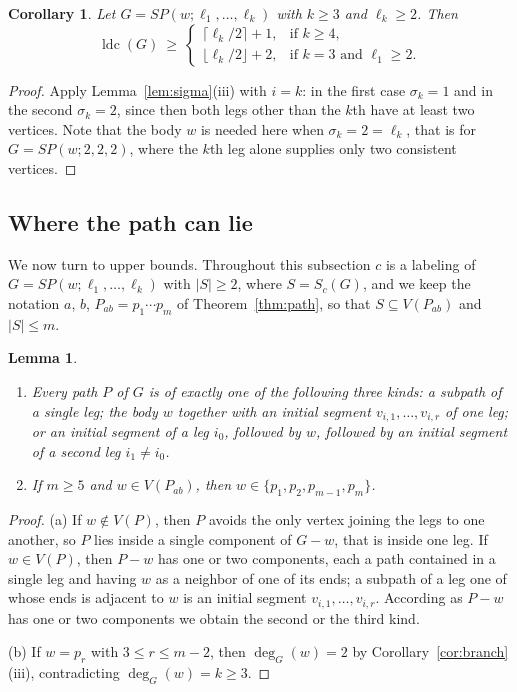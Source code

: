 \documentclass[reqno,10pt]{article}
\newtheorem{lemma}[theorem]{Lemma}
\newtheorem{corollary}[theorem]{Corollary}
\theoremstyle{definition}
\numberwithin{equation}{section}
\numberwithin{theorem}{section}
\newcommand{\ldc}{\operatorname{ldc}}
\begin{document}
\begin{corollary}
\label{cor:spiderlower}
Let $G=SP(w;\ell_1,\dots,\ell_k)$ with $k\ge3$ and $\ell_k\ge2$. Then
\[
  \ldc(G)\ \ge\
  \begin{cases}
    \lceil \ell_k/2\rceil+1, & \text{if } k\ge4,\\
    \lfloor \ell_k/2\rfloor+2, & \text{if } k=3 \text{ and } \ell_1\ge2 .
  \end{cases}
\]
\end{corollary}

\begin{proof}
Apply Lemma~\ref{lem:sigma}(iii) with $i=k$: in the first case $\sigma_k=1$ and
in the second $\sigma_k=2$, since then both legs other than the $k$th have at
least two vertices. Note that the body $w$ is needed here when
$\sigma_k=2=\ell_k$, that is for $G=SP(w;2,2,2)$, where the $k$th leg alone
supplies only two consistent vertices.
\end{proof}

\subsection{Where the path can lie}

We now turn to upper bounds. Throughout this subsection $c$ is a labeling of
$G=SP(w;\ell_1,\dots,\ell_k)$ with $|S|\ge2$, where $S=S_c(G)$, and we keep the
notation $a$, $b$, $P_{ab}=p_1\cdots p_m$ of Theorem~\ref{thm:path}, so that
$S\subseteq V(P_{ab})$ and $|S|\le m$.

\begin{lemma}
\label{lem:bodypos}
\begin{enumerate}
\item[\textup{(a)}] Every path $P$ of $G$ is of exactly one of the following
three kinds: a subpath of a single leg; the body $w$ together with an initial
segment $v_{i,1},\dots,v_{i,r}$ of one leg; or an initial segment of a leg
$i_0$, followed by $w$, followed by an initial segment of a second leg
$i_1\ne i_0$.
\item[\textup{(b)}] If $m\ge5$ and $w\in V(P_{ab})$, then
$w\in\{p_1,p_2,p_{m-1},p_m\}$.
\end{enumerate}
\end{lemma}

\begin{proof}
(a) If $w\notin V(P)$, then $P$ avoids the only vertex joining the legs to one
another, so $P$ lies inside a single component of $G-w$, that is inside one leg.
If $w\in V(P)$, then $P-w$ has one or two components, each a path contained in
a single leg and having $w$ as a neighbor of one of its ends; a subpath of a
leg one of whose ends is adjacent to $w$ is an initial segment
$v_{i,1},\dots,v_{i,r}$. According as $P-w$ has one or two components we
obtain the second or the third kind.

(b) If $w=p_r$ with $3\le r\le m-2$, then $\deg_G(w)=2$ by
Corollary~\ref{cor:branch}(iii), contradicting $\deg_G(w)=k\ge3$.
\end{proof}
\end{document}

